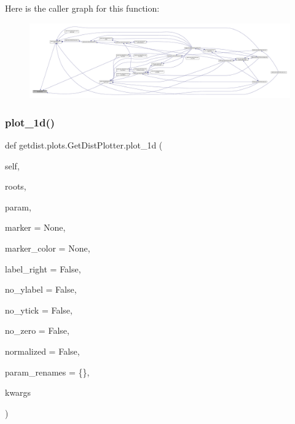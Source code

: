 Here is the caller graph for this function\+:
\nopagebreak
\begin{figure}[H]
\begin{center}
\leavevmode
\includegraphics[width=350pt]{classgetdist_1_1plots_1_1GetDistPlotter_a556fd9e8f1a884ef8673cf58e64572af_icgraph}
\end{center}
\end{figure}
\mbox{\label{classgetdist_1_1plots_1_1GetDistPlotter_aab253c97064f41256595e20f5388f86c}} 
\subsubsection{\texorpdfstring{plot\+\_\+1d()}{plot\_1d()}}
{\footnotesize\ttfamily def getdist.\+plots.\+Get\+Dist\+Plotter.\+plot\+\_\+1d (\begin{DoxyParamCaption}\item[{}]{self,  }\item[{}]{roots,  }\item[{}]{param,  }\item[{}]{marker = {\ttfamily None},  }\item[{}]{marker\+\_\+color = {\ttfamily None},  }\item[{}]{label\+\_\+right = {\ttfamily False},  }\item[{}]{no\+\_\+ylabel = {\ttfamily False},  }\item[{}]{no\+\_\+ytick = {\ttfamily False},  }\item[{}]{no\+\_\+zero = {\ttfamily False},  }\item[{}]{normalized = {\ttfamily False},  }\item[{}]{param\+\_\+renames = {\ttfamily \{\}},  }\item[{}]{kwargs }\end{DoxyParamCaption})}

